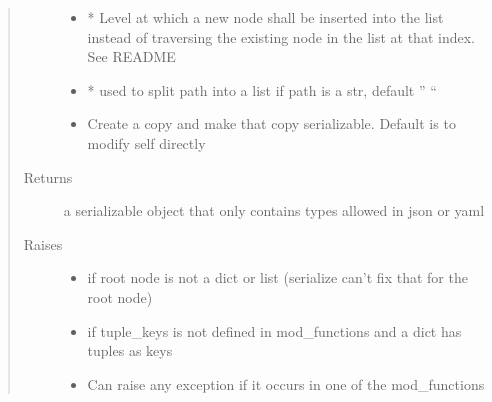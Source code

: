 \documentclass[a4paper,10pt,english]{sphinxmanual}
\begin{document}
\begin{fulllineitems}
\begin{fulllineitems}
\begin{quote}
\begin{description}
\begin{itemize}
\item {}
\sphinxAtStartPar
{} \textendash{} * Level at which a new node shall be inserted into the list instead of traversing the
existing node in the list at that index. See README

\item {}
\sphinxAtStartPar
{} \textendash{} * used to split path into a list if path is a str, default ” “

\item {}
\sphinxAtStartPar
{} \textendash{} Create a copy and make that copy serializable. Default is to modify self directly

\end{itemize}

\item[{Returns}] \leavevmode
\sphinxAtStartPar
a serializable object that only contains types allowed in json or yaml

\item[{Raises}] \leavevmode\begin{itemize}
\item {}
\sphinxAtStartPar
{} \textendash{} if root node is not a dict or list (serialize can’t fix that for the root node)

\item {}
\sphinxAtStartPar
{} \textendash{} if tuple\_keys is not defined in mod\_functions and a dict has tuples as keys

\item {}
\sphinxAtStartPar
{} \textendash{} Can raise any exception if it occurs in one of the mod\_functions

\end{itemize}

\end{description}\end{quote}

\end{fulllineitems}



\end{fulllineitems}
\end{document}
